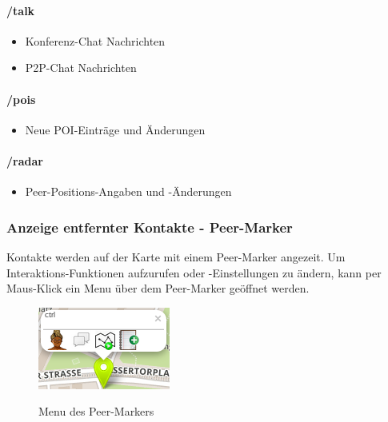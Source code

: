 \paragraph{/talk}
	\begin{itemize}
		\item Konferenz-Chat Nachrichten
		\item P2P-Chat Nachrichten
	\end{itemize}

\paragraph{/pois}
	\begin{itemize}
		\item Neue POI-Einträge und Änderungen
	\end{itemize}

\paragraph{/radar}
	\begin{itemize}
		\item Peer-Positions-Angaben und -Änderungen
	\end{itemize}

\subsubsection{Anzeige entfernter Kontakte - Peer-Marker}
Kontakte werden auf der Karte mit einem Peer-Marker angezeit. Um Interaktions-Funktionen aufzurufen oder -Einstellungen zu ändern, kann per Maus-Klick ein Menu über dem Peer-Marker geöffnet werden.

  \begin{figure}[H]
      \centering
	  \includegraphics[scale=0.8]{bilder/screenshots/menu_peermarker.png}\\ 
  	  \caption{Menu des Peer-Markers}
  \end{figure}

